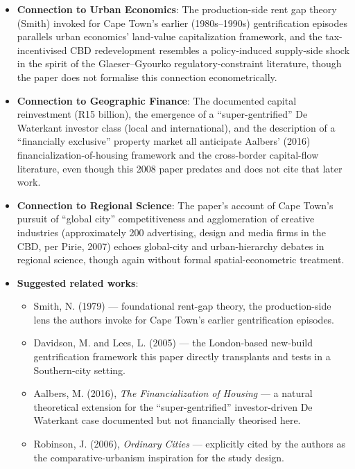 \begin{itemize}
  \item \textbf{Connection to Urban Economics}: The production-side rent gap theory (Smith) invoked for Cape Town's earlier (1980s--1990s) gentrification episodes parallels urban economics' land-value capitalization framework, and the tax-incentivised CBD redevelopment resembles a policy-induced supply-side shock in the spirit of the Glaeser--Gyourko regulatory-constraint literature, though the paper does not formalise this connection econometrically.
  \item \textbf{Connection to Geographic Finance}: The documented capital reinvestment (R15 billion), the emergence of a ``super-gentrified'' De Waterkant investor class (local and international), and the description of a ``financially exclusive'' property market all anticipate Aalbers' (2016) financialization-of-housing framework and the cross-border capital-flow literature, even though this 2008 paper predates and does not cite that later work.
  \item \textbf{Connection to Regional Science}: The paper's account of Cape Town's pursuit of ``global city'' competitiveness and agglomeration of creative industries (approximately 200 advertising, design and media firms in the CBD, per Pirie, 2007) echoes global-city and urban-hierarchy debates in regional science, though again without formal spatial-econometric treatment.
  \item \textbf{Suggested related works}:
  \begin{itemize}
    \item Smith, N. (1979) --- foundational rent-gap theory, the production-side lens the authors invoke for Cape Town's earlier gentrification episodes.
    \item Davidson, M. and Lees, L. (2005) --- the London-based new-build gentrification framework this paper directly transplants and tests in a Southern-city setting.
    \item Aalbers, M. (2016), \emph{The Financialization of Housing} --- a natural theoretical extension for the ``super-gentrified'' investor-driven De Waterkant case documented but not financially theorised here.
    \item Robinson, J. (2006), \emph{Ordinary Cities} --- explicitly cited by the authors as the comparative-urbanism inspiration for the study design.
  \end{itemize}
\end{itemize}

